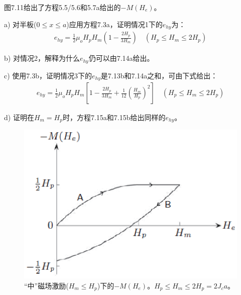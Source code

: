 图7.11给出了方程5.5/5.6和5.7a给出的$−M(H_e)$。

a) 对半板($0\le x\le a$)应用方程7.3a，证明情况1下的$e_{hy}$为：
\begin{align*}%
e_{hy}=\frac{1}{2}\mu_oH_pH_m\left(1-\frac{2H_p}{3H_m}\right)\quad   (H_p\leq H_m\leq 2H_p)\tag{7.13b}
\end{align*}

b) 对情况2，解释为什么$e_{hy}$仍可以由7.14a给出。

c) 使用7.3b，证明情况3下的$e_{hy}$是7.13b和7.14a之和，可由下式给出：
\begin{align*}%
e_{hy}=\frac{1}{2}\mu_oH_pH_m\left[1-\frac{2H_p}{3H_m}+\frac{1}{12}\left(\frac{H_m}{H_p}\right)^2\right]     \quad (H_p\leq H_m \leq 2H_p) \tag{7.15b}
\end{align*}

d) 证明在$H_m=H_p$时，方程7.15a和7.15b给出同样的$e_{hy}$。

\begin{figure}[htbp]
	\centering
	\includegraphics[scale=0.7]{chpt7/figs/fig7.11.eps}
	\caption{“中”磁场激励($H_m\le H_p$)下的$-M(H_e)$。$H_p\le H_m\le 2H_p=2J_c a$。}
\end{figure}

